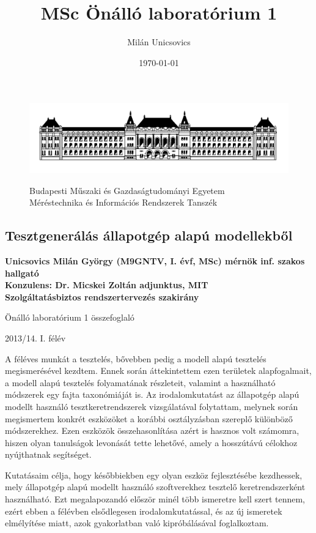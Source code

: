 \documentclass{article}
\author{Milán Unicsovics}
\title{MSc Önálló laboratórium 1}
\date{\today}
\begin{document}
\thispagestyle{empty}
\begin{figure}[htp]
\centering
\includegraphics[scale=0.3]{img/bme.png}
\begin{center}
Budapesti Műszaki és Gazdaságtudományi Egyetem\\
Méréstechnika és Információs Rendszerek Tanszék
\end{center}
\end{figure}
\vspace*{-0.1in}
\begin{center}
\subsection*{Tesztgenerálás állapotgép alapú modellekből}
{\bf
Unicsovics Milán György (M9GNTV, I. évf, MSc) mérnök inf. szakos hallgató\\[0.3cm]

Konzulens: Dr. Micskei Zoltán adjunktus, MIT\\[0.3cm]

Szolgáltatásbiztos rendszertervezés szakirány 

Önálló laboratórium 1 összefoglaló 

2013/14. I. félév
}
\end{center}
\vspace{0.5cm}

A féléves munkát a tesztelés, bővebben pedig a modell alapú tesztelés megismerésével kezdtem. Ennek során áttekintettem ezen területek alapfogalmait, a modell alapú tesztelés folyamatának részleteit, valamint a használható módszerek egy fajta taxonómiáját is. Az irodalomkutatást az állapotgép alapú modellt használó tesztkeretrendszerek vizsgálatával folytattam, melynek során megismertem konkrét eszközöket a korábbi osztályzásban szereplő különböző módszerekhez. Ezen eszközök összehasonlítása azért is hasznos volt számomra, hiszen olyan tanulságok levonását tette lehetővé, amely a hosszútávú célokhoz nyújthatnak segítséget.

Kutatásaim célja, hogy későbbiekben egy olyan eszköz fejlesztésébe kezdhessek, mely állapotgép alapú modellt használó szoftverekhez tesztelő keretrendszerként használható. Ezt megalapozandó először minél több ismeretre kell szert tennem, ezért ebben a félévben elsődlegesen irodalomkutatással, és az új ismeretek elmélyítése miatt, azok gyakorlatban való kipróbálásával foglalkoztam.
\end{document}

